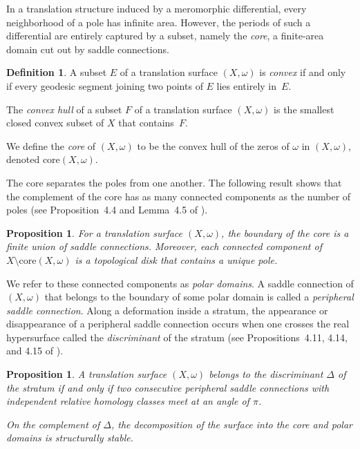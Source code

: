 \documentclass[11]{amsart}
\theoremstyle{plain}
\newtheorem{proposition}[theorem]{Proposition}
\theoremstyle{definition}
\newtheorem{definition}[theorem]{Definition}
\begin{document}
In a translation structure induced by a meromorphic differential, every neighborhood of a pole has infinite area. However, the periods of such a differential are entirely captured by a subset, namely the \textit{core}, a finite-area domain cut out by saddle connections. 
\par 
\begin{definition}\label{defn:core}
A subset $E$ of a translation surface $(X,\omega)$ is \textit{convex} if and only if every geodesic segment joining two points of $E$ lies entirely in~$E$.
\par
The \textit{convex hull} of a subset $F$ of a translation surface $(X,\omega)$ is the smallest closed convex subset of $X$ that contains~$F$.
\par
We define the {\em core} of $(X,\omega)$ to be the convex hull of the zeros of $\omega$ in $(X,\omega)$, denoted $\text{core}(X,\omega)$.  
\end{definition}
\par 
The core separates the poles from one another. The following result shows that the complement of the core has as many connected components as the number of poles (see Proposition~4.4 and Lemma~4.5 of \cite{Ta18}).    
\par 
\begin{proposition}\label{prop:decomppoles}
For a translation surface $(X,\omega)$, the boundary of the core is a finite union of saddle connections. Moreover, each connected component of $X \setminus \text{core}(X,\omega)$ is a topological disk that contains a unique pole. 
\end{proposition}

We refer to these connected components as \textit{polar domains}. A saddle connection of $(X,\omega)$ that belongs to the boundary of some polar domain is called a \textit{peripheral saddle connection}. Along a deformation inside a stratum, the appearance or disappearance of a peripheral saddle connection occurs when one crosses the real hypersurface called the {\em discriminant} of the stratum (see Propositions~4.11, 4.14, and 4.15 of \cite{Ta18}). 

\begin{proposition}\label{prop:Discriminant}
A translation surface $(X,\omega)$ belongs to the discriminant $\Delta$ of the stratum if and only if two consecutive peripheral saddle connections with independent relative homology classes meet at an angle of $\pi$.
\par
On the complement of $\Delta$, the decomposition of the surface into the core and polar domains is structurally stable. 
\end{proposition}
\end{document}
